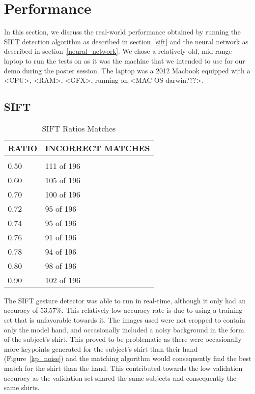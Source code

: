 \section{Performance}
\label{performance}

In this section, we discuss the real-world performance obtained by running the SIFT detection algorithm as described in section~\ref{sift} and the neural network as described in section~\ref{neural_network}. We chose a relatively old, mid-range laptop to run the tests on as it was the machine that we intended to use for our demo during the poster session. The laptop was a 2012 Macbook equipped with a <CPU>, <RAM>, <GFX>, running on <MAC OS darwin???>.

\subsection{SIFT}

\begin{table}[t]
\caption{SIFT Ratios Matches}
\label{sift_ratios}
\begin{center}
\begin{tabular}{ll}
\multicolumn{1}{c}{\bf RATIO}  &\multicolumn{1}{c}{\bf INCORRECT MATCHES}
\\ \hline \\
0.50             &111 of 196 \\
0.60             &105 of 196 \\
0.70             &100 of 196 \\
0.72             &95 of 196 \\
0.74             &95 of 196 \\
0.76             &91 of 196 \\
0.78             &94 of 196 \\
0.80             &98 of 196 \\
0.90             &102 of 196 \\
\end{tabular}
\end{center}
\end{table}

The SIFT gesture detector was able to run in real-time, although it only had an accuracy of 53.57\%. This relatively low accuracy rate is due to using a training set that is unfavorable towards it. The images used were not cropped to contain only the model hand, and occasionally included a noisy background in the form of the subject's shirt. This proved to be problematic as there were occasionally more keypoints generated for the subject's shirt than their hand (Figure~\ref{kp_noise}) and the matching algorithm would consequently find the best match for the shirt than the hand. This contributed towards the low validation accuracy as the validation set shared the same subjects and consequently the same shirts.


